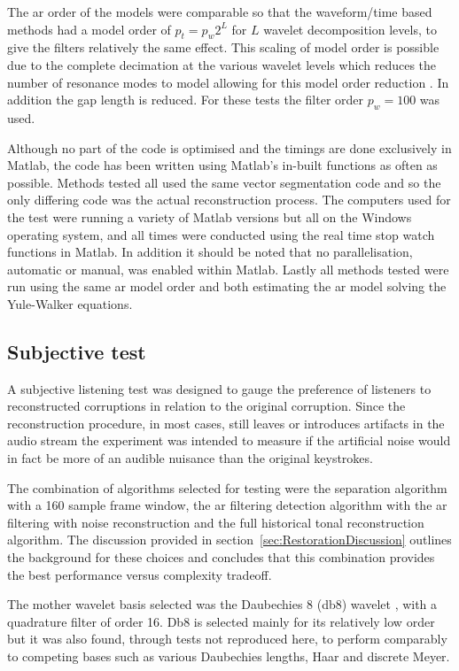 The \gls{ar} order of the models were comparable so that the waveform/time based methods had a model order of $p_t = p_w 2^L$ for $L$ wavelet decomposition levels, to give the filters relatively the same effect. This scaling of model order is possible due to the complete decimation at the various wavelet levels which reduces the number of resonance modes to model allowing for this model order reduction \cite{Esquef2006}. In addition the gap length is reduced. For these tests the filter order $p_w = 100$ was used.

Although no part of the code is optimised and the timings are done exclusively in Matlab, the code has been written using Matlab's in-built functions as often as possible. Methods tested all used the same vector segmentation code and so the only differing code was the actual reconstruction process. The computers used for the test were running a variety of Matlab versions but all on the Windows operating system, and all times were conducted using the real time stop watch functions in Matlab. In addition it should be noted that no parallelisation, automatic or manual, was enabled within Matlab. Lastly all methods tested were run using the same \gls{ar} model order and both estimating the \gls{ar} model solving the Yule-Walker equations.

\subsection{Subjective test}
A subjective listening test was designed to gauge the preference of listeners to reconstructed corruptions in relation to the original corruption. Since the reconstruction procedure, in most cases, still leaves or introduces artifacts in the audio stream the experiment was intended to measure if the artificial noise would in fact be more of an audible nuisance than the original keystrokes.

The combination of algorithms selected for testing were the separation algorithm with a 160 sample frame window, the \gls{ar} filtering detection algorithm with the \gls{ar} filtering with noise reconstruction and the full historical tonal reconstruction algorithm. The discussion provided in section~\ref{sec:RestorationDiscussion} outlines the background for these choices and concludes that this combination provides the best performance versus complexity tradeoff.

The mother wavelet basis selected was the Daubechies 8 (db8) wavelet \cite{Daubechies1992}, with a quadrature filter of order 16. Db8 is selected mainly for its relatively low order but it was also found, through tests not reproduced here, to perform comparably to competing bases such as various Daubechies lengths, Haar and discrete Meyer.


